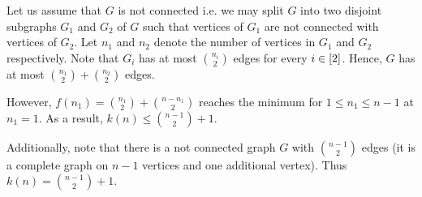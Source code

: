\begin{chapterendexercises}
\begin{solution}
      Let us assume that $G$ is not connected i.e. we may split $G$ into two
      disjoint subgraphs $G_1$ and $G_2$ of $G$ such that vertices of $G_1$ are
      not connected with vertices of $G_2$. Let $n_1$ and $n_2$ denote the
      number of vertices in $G_1$ and $G_2$ respectively. Note that $G_i$ has at
      most $\binom{n_i}{2}$ edges for every $i \in {[{2}]}$. Hence, $G$ has at
      most $\binom{n_1}{2} + \binom{n_2}{2}$ edges.

      However, $f(n_1) = \binom{n_1}{2} + \binom{n - n_1}{2}$ reaches the minimum for 
      $1 \le n_1 \le n - 1$ at $n_1 = 1$. As a result, $k(n) \le \binom{n - 1}{2} + 1$.

      Additionally, note that there is a not connected graph $G$ with $\binom{n
      - 1}{2}$ edges (it is a complete graph on $n - 1$ vertices and one
      additional vertex). Thus $k(n) = \binom{n-1}{2} + 1$.
    \end{solution}
\end{chapterendexercises}
